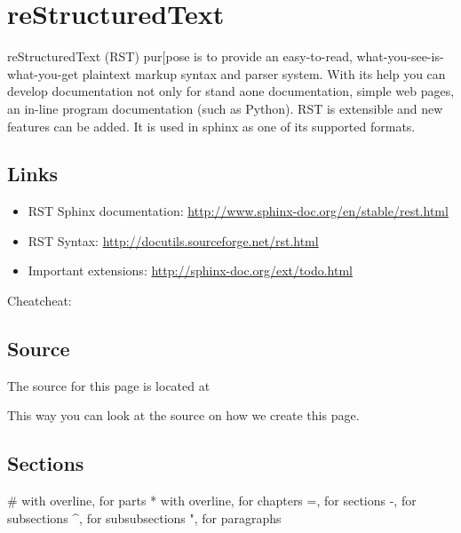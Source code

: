 \FILENAME

\section{reStructuredText}\label{restructuredtext}

reStructuredText (RST) pur{[}pose is to provide an easy-to-read,
what-you-see-is-what-you-get plaintext markup syntax and parser system.
With its help you can develop documentation not only for stand aone
documentation, simple web pages, an in-line program documentation (such
as Python). RST is extensible and new features can be added. It is used
in sphinx as one of its supported formats.

\subsection{Links}\label{links}

\begin{itemize}
\tightlist
\item
  RST Sphinx documentation:
  \url{http://www.sphinx-doc.org/en/stable/rest.html}
\item
  RST Syntax: \url{http://docutils.sourceforge.net/rst.html}
\item
  Important extensions: \url{http://sphinx-doc.org/ext/todo.html}
\end{itemize}

Cheatcheat:
\smallskip


\subsection{Source}\label{source}

The source for this page is located at


This way you can look at the source on how we create this page.

\subsection{Sections}\label{sections}

\# with overline, for parts * with overline, for chapters =, for
sections -, for subsections \^{}, for subsubsections ", for paragraphs

